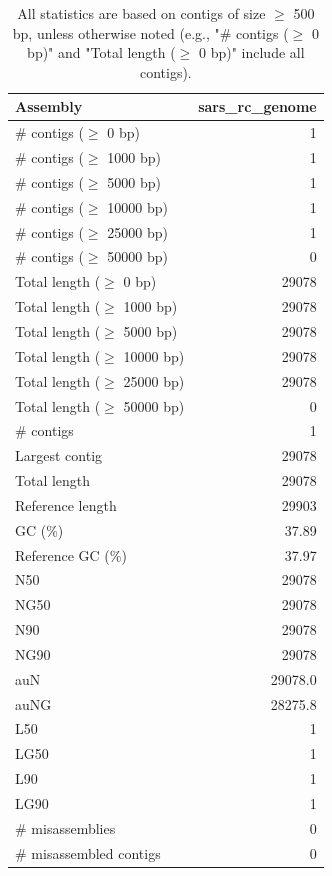 \documentclass[12pt,a4paper]{article}
\begin{document}
\begin{table}[ht]
\begin{center}
\caption{All statistics are based on contigs of size $\geq$ 500 bp, unless otherwise noted (e.g., "\# contigs ($\geq$ 0 bp)" and "Total length ($\geq$ 0 bp)" include all contigs).}
\begin{tabular}{|l*{1}{|r}|}
\hline
Assembly & sars\_rc\_genome \\ \hline
\# contigs ($\geq$ 0 bp) & 1 \\ \hline
\# contigs ($\geq$ 1000 bp) & 1 \\ \hline
\# contigs ($\geq$ 5000 bp) & 1 \\ \hline
\# contigs ($\geq$ 10000 bp) & 1 \\ \hline
\# contigs ($\geq$ 25000 bp) & 1 \\ \hline
\# contigs ($\geq$ 50000 bp) & 0 \\ \hline
Total length ($\geq$ 0 bp) & 29078 \\ \hline
Total length ($\geq$ 1000 bp) & 29078 \\ \hline
Total length ($\geq$ 5000 bp) & 29078 \\ \hline
Total length ($\geq$ 10000 bp) & 29078 \\ \hline
Total length ($\geq$ 25000 bp) & 29078 \\ \hline
Total length ($\geq$ 50000 bp) & 0 \\ \hline
\# contigs & 1 \\ \hline
Largest contig & 29078 \\ \hline
Total length & 29078 \\ \hline
Reference length & 29903 \\ \hline
GC (\%) & 37.89 \\ \hline
Reference GC (\%) & 37.97 \\ \hline
N50 & 29078 \\ \hline
NG50 & 29078 \\ \hline
N90 & 29078 \\ \hline
NG90 & 29078 \\ \hline
auN & 29078.0 \\ \hline
auNG & 28275.8 \\ \hline
L50 & 1 \\ \hline
LG50 & 1 \\ \hline
L90 & 1 \\ \hline
LG90 & 1 \\ \hline
\# misassemblies & 0 \\ \hline
\# misassembled contigs & 0 \\ \hline

\end{tabular}
\end{center}
\end{table}
\end{document}

